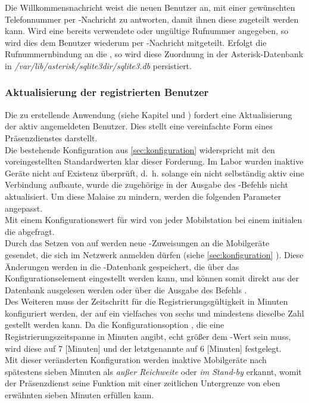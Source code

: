Die Willkommensnachricht weist die neuen Benutzer an, mit einer gewünschten Telefonnummer per \SMS-Nachricht zu antworten, damit ihnen diese zugeteilt werden kann. Wird eine bereits verwendete oder ungültige Rufnummer angegeben, so wird dies dem Benutzer wiederum per \SMS-Nachricht mitgeteilt.
Erfolgt die Rufnummernbindung an die \IMSI, so wird diese Zuordnung in der Asterisk-Datenbank in \emph{/var/lib/asterisk/sqlite3dir/sqlite3.db} persistiert.

\subsubsection{Aktualisierung der registrierten Benutzer}
Die zu erstellende Anwendung (siehe Kapitel  und ) fordert eine Aktualisierung der aktiv angemeldeten Benutzer. Dies stellt eine vereinfachte Form eines Präsenzdienstes darstellt.\\
Die bestehende Konfiguration aus \autoref{sec:konfiguration} widerspricht mit den voreingestellten Standardwerten klar dieser Forderung. 
Im Labor wurden inaktive Geräte nicht auf Existenz überprüft, d.~h. solange ein \UE nicht selbständig aktiv eine Verbindung aufbaute, wurde die zugehörige \IMSI in der Ausgabe des -Befehls nicht aktualisiert. Um diese Malaise  zu mindern, werden die folgenden Parameter angepasst.\\
Mit einem Konfigurationswert  für  wird von jeder Mobilstation bei einem initialen \LUR die \IMEI abgefragt.\\
Durch das Setzen von  auf  werden neue \TMSI-Zuweisungen an die Mobilgeräte gesendet, die sich im Netzwerk anmelden dürfen (siehe \autoref{sec:konfiguration} ). Diese Änderungen werden in die \TMSI-Datenbank gespeichert, die über das Konfigurationselement  eingestellt werden kann, und können somit direkt aus der Datenbank ausgelesen werden oder über die Ausgabe des Befehls .\\
Des Weiteren muss der Zeitschritt für die Registrierungsgültigkeit in Minuten  konfiguriert werden, der auf ein vielfaches von sechs und mindestens dieselbe Zahl gestellt werden kann. Da die Konfigurationsoption , die eine Registrierungszeitspanne in Minuten angibt, echt größer dem -Wert sein muss, wird diese auf 7 [Minuten] und der letztgenannte auf 6 [Minuten] festgelegt.\\
Mit dieser veränderten Konfiguration werden inaktive Mobilgeräte nach spätestens sieben Minuten als \emph{außer Reichweite} oder \emph{im Stand-by} erkannt, womit der Präsenzdienst seine Funktion mit einer zeitlichen Untergrenze von eben erwähnten sieben Minuten erfüllen kann.
